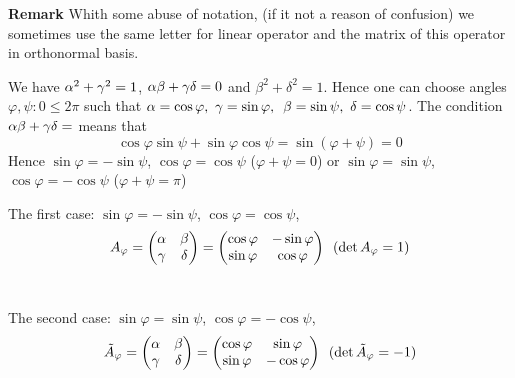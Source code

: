 \documentclass[12pt]{article}
\numberwithin{equation}{section}
\begin{document}
{\bf Remark} Whith some abuse of notation,
 (if it not a reason of confusion)
we sometimes use the same letter
for linear operator and the matrix of this operator in orthonormal basis.


 We have  $\alpha^2+\gamma^2=1$, $\alpha\beta+\gamma\delta=0$ and $\beta^2+\delta^2=1$.  Hence one can choose angles
  $\varphi,\psi \colon 0\leq 2\pi$ such that
               $\alpha=\cos\varphi,\,\,\gamma=\sin\varphi,\,\,\,\beta=\sin\psi,\,\,\delta=\cos\psi$.
 The condition  $\alpha\beta+\gamma\delta=$ means that
                 $$
            \cos\varphi\sin\psi+ \sin\varphi\cos\psi=\sin(\varphi+\psi)=0
                 $$
Hence $\sin \varphi=-\sin \psi$, $\cos\varphi=\cos\psi$ ($\varphi+\psi=0$) or
$\sin \varphi=\sin \psi$, $\cos\varphi=-\cos\psi$ ($\varphi+\psi=\pi$)


The first case:  $\sin \varphi=-\sin \psi$, $\cos\varphi=\cos\psi$,
   \begin{equation}\label{orthogonalrotation}
    A_\varphi=\begin{pmatrix}
      \alpha & \beta \\
      \gamma & \delta\\
       \end{pmatrix}=\begin{pmatrix}
      \cos\varphi & -\sin\varphi \\
      \sin\varphi & \cos\varphi\\
       \end{pmatrix}\,\,\,(\det A_\varphi=1)
\end{equation}\

 The second case: $\sin \varphi=\sin \psi$, $\cos\varphi=-\cos\psi$,
   \begin{equation}\label{orthogonalrotation+reflection}
    \tilde A_\varphi=\begin{pmatrix}
      \alpha & \beta \\
      \gamma & \delta\\
       \end{pmatrix}=\begin{pmatrix}
      \cos\varphi & \sin\varphi \\
      \sin\varphi & -\cos\varphi\\
       \end{pmatrix}\,\,\, (\det \tilde A_\varphi=-1)
\end{equation}


\m
\end{document}
